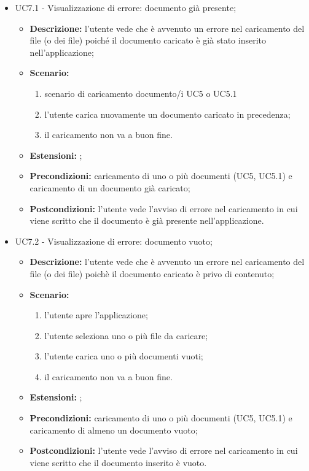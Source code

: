 \documentclass[10pt, a4paper]{article}
\begin{document}
\begin{itemize}
    \item UC7.1 - Visualizzazione di errore: documento già presente;   
    \begin{itemize}
    \item \textbf{Descrizione: }l'utente vede che è avvenuto un errore nel caricamento del file (o dei file) poiché il documento caricato è già stato inserito nell'applicazione;
        \item \textbf{Scenario: }
        \begin{enumerate}[label={\arabic*.}, align=left]
        \item scenario di caricamento documento/i UC5 o UC5.1
        \item l'utente carica nuovamente un documento caricato in precedenza;
        \item il caricamento non va a buon fine.
        \end{enumerate}
        \item \textbf{Estensioni: };
        \item \textbf{Precondizioni:} caricamento di uno o più documenti (UC5, UC5.1) e caricamento di un documento già caricato;
        \item \textbf{Postcondizioni:} l'utente vede l'avviso di errore nel caricamento in cui viene scritto che il documento è già presente nell'applicazione.
    \end{itemize}

    \item UC7.2 - Visualizzazione di errore: documento vuoto;
    \begin{itemize}
    \item \textbf{Descrizione: }l'utente vede che è avvenuto un errore nel caricamento del file (o dei file) poichè il documento caricato è privo di contenuto;
        \item \textbf{Scenario: }
        \begin{enumerate}[label={\arabic*.}, align=left]
        \item l'utente apre l'applicazione;
        \item l'utente seleziona uno o più file da caricare;
        \item l'utente carica uno o più documenti vuoti;
        \item il caricamento non va a buon fine.
        \end{enumerate}
        \item \textbf{Estensioni: };
        \item \textbf{Precondizioni:} caricamento di uno o più documenti (UC5, UC5.1) e caricamento di almeno un documento vuoto;
        \item \textbf{Postcondizioni:} l'utente vede l'avviso di errore nel caricamento in cui viene scritto che il documento inserito è vuoto.
    \end{itemize}


\end{itemize}
\end{document}
